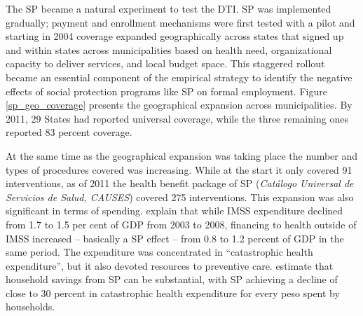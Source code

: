 \documentclass[oneside,11pt]{article}
\begin{document}
The SP became a natural experiment to test the DTI. SP was implemented gradually; payment and enrollment mechanisms were first tested with a pilot and starting in 2004 coverage expanded geographically across states that signed up and within states across municipalities based on health need, organizational capacity to deliver services, and local budget space.  This staggered rollout became an essential component of the empirical strategy to identify the negative effects of social protection programs like SP on formal employment. Figure \ref{sp_geo_coverage} presents the geographical expansion across municipalities. By 2011, 29 States had reported universal coverage, while the three remaining ones reported 83 percent coverage.


At the same time as the geographical expansion was taking place the number and types of procedures covered was increasing. While at the start it only covered 91 interventions, as of 2011 the health benefit package of SP (\textit{Catálogo Universal de Servicios de Salud, CAUSES}) covered 275 interventions. This expansion was also significant in terms of spending. \cite{Campos} explain that while IMSS expenditure declined from 1.7 to 1.5 per cent of GDP from 2003 to 2008, financing to health outside of IMSS increased -- basically a SP effect -- from 0.8 to 1.2 percent of GDP in the same period. The expenditure was concentrated in ``catastrophic health expenditure'', but it also devoted resources to preventive care. \cite{CIDE} estimate that household savings from SP can be substantial, with SP achieving a decline of close to 30 percent in catastrophic health expenditure for every peso spent by households.
\end{document}
